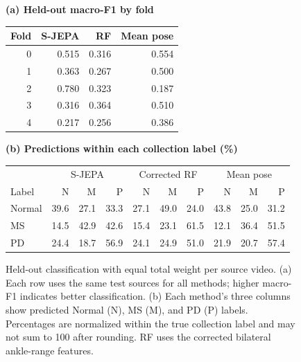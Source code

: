 \begin{figure}[t]
\centering
\begin{minipage}[t]{0.36\textwidth}
\centering
\small
\textbf{(a) Held-out macro-F1 by fold}\\[5pt]
\begin{tabular}{rrrr}
\hline
Fold & S-JEPA & RF & Mean pose \\
\hline
0 & 0.515 & 0.316 & 0.554 \\
1 & 0.363 & 0.267 & 0.500 \\
2 & 0.780 & 0.323 & 0.187 \\
3 & 0.316 & 0.364 & 0.510 \\
4 & 0.217 & 0.256 & 0.386 \\
\hline
\end{tabular}
\end{minipage}\hfill
\begin{minipage}[t]{0.62\textwidth}
\centering
\small
\textbf{(b) Predictions within each collection label (\%)}\\[5pt]
\setlength{\tabcolsep}{3pt}
\begin{tabular}{lrrr|rrr|rrr}
\hline
 & \multicolumn{3}{c|}{S-JEPA} & \multicolumn{3}{c|}{Corrected RF} & \multicolumn{3}{c}{Mean pose} \\
Label & N & M & P & N & M & P & N & M & P \\
\hline
Normal & 39.6 & 27.1 & 33.3 & 27.1 & 49.0 & 24.0 & 43.8 & 25.0 & 31.2 \\
MS & 14.5 & 42.9 & 42.6 & 15.4 & 23.1 & 61.5 & 12.1 & 36.4 & 51.5 \\
PD & 24.4 & 18.7 & 56.9 & 24.1 & 24.9 & 51.0 & 21.9 & 20.7 & 57.4 \\
\hline
\end{tabular}
\end{minipage}
\caption{Held-out classification with equal total weight per source video. (a) Each row uses the same test sources for all methods; higher macro-F1 indicates better classification. (b) Each method's three columns show predicted Normal (N), MS (M), and PD (P) labels. Percentages are normalized within the true collection label and may not sum to 100 after rounding. RF uses the corrected bilateral ankle-range features.}
\label{fig:results_revised}
\end{figure}

